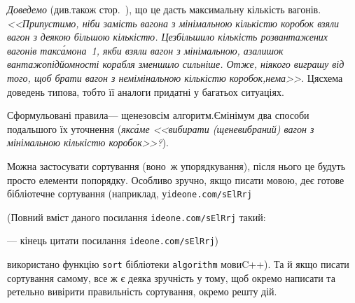 \documentclass[14pt,a4paper]{extarticle}
\renewcommand{\baselinestretch}{1.3125}
\begin{document}
\label{text:proof-example-train-to-ship} %
\emph{Доведемо} (див.\nolinebreak[2] також стор.~\pageref{text:need-or-no-need-to-prove}), що це дасть максимальну кількість вагонів.
\textsl{<<Припустимо, ніби замість вагона з мінімальною кількістю коробок взяли вагон з деякою більшою кількістю. Це\nolinebreak[3] збільшило кількість розвантажених вагонів так\nolinebreak[3] с\'{а}мо\nolinebreak[1] на~1, якби взяли вагон з мінімальною, а\nolinebreak[3] залишок вантажо\-підйом\-ності корабля зменшило сильніше. Отже, ніякого виграшу від того, щоб брати вагон з немімінальною кількістю коробок,\nolinebreak[1] \mbox{нема}>>.} 
Ця\nolinebreak[2] схема доведень типова, тобто її аналоги придатні у багатьох ситуаціях.


Сформульовані правила\nolinebreak[3] --- ще\nolinebreak[2] не\nolinebreak[3] зовсім алгоритм.\linebreak[1] Є\nolinebreak[3] мінімум два способи подальшого їх уточнення (\emph{як\nolinebreak[3] с\'{а}ме \textsl{<<вибирати (ще\nolinebreak[3] не\nolinebreak[3] вибраний) вагон з мінімальною кількістю коробок>>}?}).

Можна застосувати сортування (воно~ж упорядкування), після нього це будуть просто елементи  по\nolinebreak[3] порядку. Особливо зручно, якщо писати мовою, де\nolinebreak[2] є готове бібліотечне сортування (наприклад, у\nolinebreak[2] 
\verb"ideone.com/sElRrj"


{\color{green}\begin{small}

\renewcommand{\baselinestretch}{0.875}

(Повний вміст даного посилання \verb"ideone.com/sElRrj" такий:

--- кінець цитати посилання \verb"ideone.com/sElRrj")

\end{small}}


 використано функцію \verb"sort" бібліотеки \verb"algorithm" мови\nolinebreak[3] C++). Та й якщо писати сортування самому, все ж є деяка зручність у тому, щоб окремо написати та ретельно вивірити правильність сортування, окремо решту дій.
\end{document}
